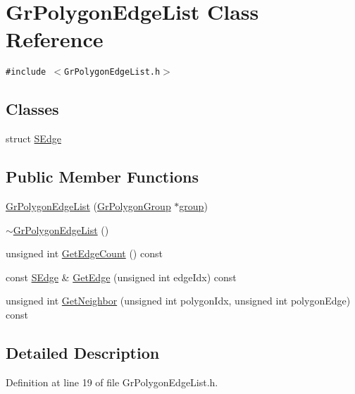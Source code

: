 \hypertarget{class_gr_polygon_edge_list}{
\section{GrPolygonEdgeList Class Reference}
\label{class_gr_polygon_edge_list}
}
{\tt \#include $<$GrPolygonEdgeList.h$>$}

\subsection*{Classes}
\begin{CompactItemize}
\item 
struct \hyperlink{struct_gr_polygon_edge_list_1_1_s_edge}{SEdge}
\end{CompactItemize}
\subsection*{Public Member Functions}
\begin{CompactItemize}
\item 
\hyperlink{class_gr_polygon_edge_list_92c9be118f3b13c157c5e3912ce163d2}{GrPolygonEdgeList} (\hyperlink{class_gr_polygon_group}{GrPolygonGroup} $\ast$\hyperlink{wglext_8h_69cec9b28d037f2272131b4fcd148620}{group})
\item 
\hyperlink{class_gr_polygon_edge_list_549338e6b0dbcabfdae3ae0b5b909969}{$\sim$GrPolygonEdgeList} ()
\item 
unsigned int \hyperlink{class_gr_polygon_edge_list_cce9c1dcca74841f88e1b7193a39d20f}{GetEdgeCount} () const 
\item 
const \hyperlink{struct_gr_polygon_edge_list_1_1_s_edge}{SEdge} \& \hyperlink{class_gr_polygon_edge_list_1d41a367bd17a6953fb253347d3d8588}{GetEdge} (unsigned int edgeIdx) const 
\item 
unsigned int \hyperlink{class_gr_polygon_edge_list_f59bed99946b385a88a82f9a2e32812c}{GetNeighbor} (unsigned int polygonIdx, unsigned int polygonEdge) const 
\end{CompactItemize}


\subsection{Detailed Description}


Definition at line 19 of file GrPolygonEdgeList.h.

